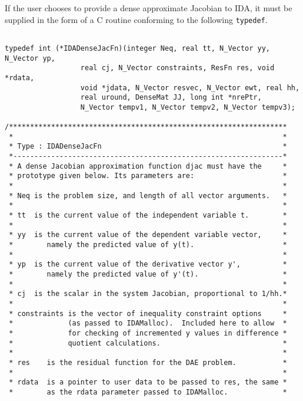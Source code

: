 \documentclass[11pt]{article}
\begin{document}
If the user chooses to provide a dense approximate Jacobian to IDA, it
must be supplied in the form of a C routine conforming to the
following {\tt typedef}.

\small
\begin{verbatim}
  
typedef int (*IDADenseJacFn)(integer Neq, real tt, N_Vector yy, N_Vector yp,
                  real cj, N_Vector constraints, ResFn res, void *rdata,
                  void *jdata, N_Vector resvec, N_Vector ewt, real hh,
                  real uround, DenseMat JJ, long int *nrePtr,
                  N_Vector tempv1, N_Vector tempv2, N_Vector tempv3);
 
/******************************************************************
 *                                                                *           
 * Type : IDADenseJacFn                                           *
 *----------------------------------------------------------------*
 * A dense Jacobian approximation function djac must have the     *
 * prototype given below. Its parameters are:                     *
 *                                                                *
 * Neq is the problem size, and length of all vector arguments.   *
 *                                                                *
 * tt  is the current value of the independent variable t.        *
 *                                                                *
 * yy  is the current value of the dependent variable vector,     *
 *        namely the predicted value of y(t).                     *
 *                                                                *
 * yp  is the current value of the derivative vector y',          *
 *        namely the predicted value of y'(t).                    *
 *                                                                *
 * cj  is the scalar in the system Jacobian, proportional to 1/hh.*
 *                                                                *
 * constraints is the vector of inequality constraint options     *
 *             (as passed to IDAMalloc).  Included here to allow  *
 *             for checking of incremented y values in difference *
 *             quotient calculations.                             *
 *                                                                *
 * res    is the residual function for the DAE problem.           *
 *                                                                *
 * rdata  is a pointer to user data to be passed to res, the same *
 *        as the rdata parameter passed to IDAMalloc.             *

\end{verbatim}
\end{document}
